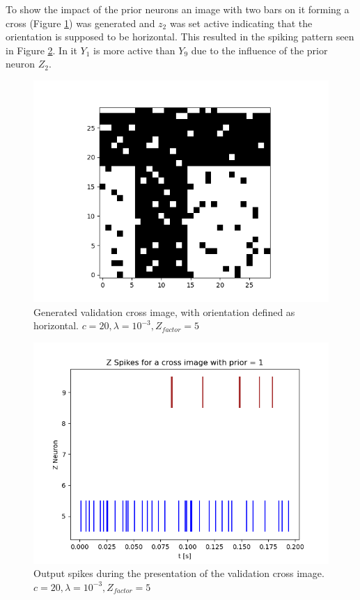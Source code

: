 To show the impact of the prior neurons an image with two bars on it forming a cross (Figure \ref{fig:horvertValidationCross}) was generated and $z_2$ was set active indicating that the orientation is supposed to be horizontal. This resulted in the spiking pattern seen in Figure \ref{fig:horvert_c20_3_Zfactor5_crossZSpikes}. In it $Y_1$ is more active than $Y_9$ due to the influence of the prior neuron $Z_2$.

\begin{figure}
  \includegraphics[width=\linewidth]{figures/horvert/horvert_c20_3_Zfactor5_validationCross.png}
  \caption{Generated validation cross image, with orientation defined as horizontal. $c = 20, \lambda = 10^{-3}, Z_{factor} = 5$}
  \label{fig:horvertValidationCross}
\end{figure}

\begin{figure}
  \includegraphics[width=\linewidth]{figures/horvert/horvert_c20_3_Zfactor5_crossZSpikes.png}
  \caption{Output spikes during the presentation of the validation cross image. $c = 20, \lambda = 10^{-3}, Z_{factor} = 5$}
  \label{fig:horvert_c20_3_Zfactor5_crossZSpikes}
\end{figure}





